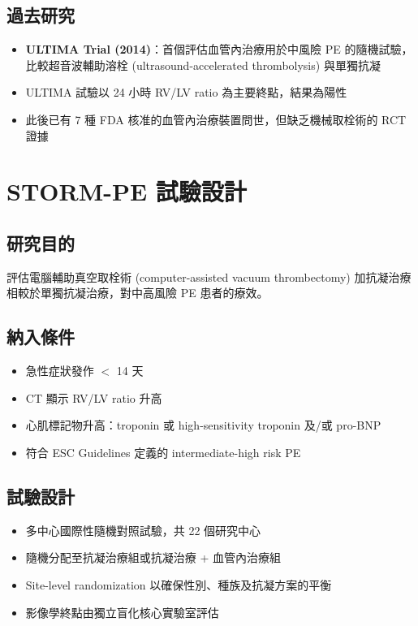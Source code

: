 \documentclass[12pt,a4paper]{article}
\begin{document}
\subsection{過去研究}

\begin{itemize}
    \item \textbf{ULTIMA Trial (2014)}：首個評估血管內治療用於中風險 PE 的隨機試驗，比較超音波輔助溶栓 (ultrasound-accelerated thrombolysis) 與單獨抗凝
    \item ULTIMA 試驗以 24 小時 RV/LV ratio 為主要終點，結果為陽性
    \item 此後已有 7 種 FDA 核准的血管內治療裝置問世，但缺乏機械取栓術的 RCT 證據
\end{itemize}

\section{STORM-PE 試驗設計}

\subsection{研究目的}
評估電腦輔助真空取栓術 (computer-assisted vacuum thrombectomy) 加抗凝治療相較於單獨抗凝治療，對中高風險 PE 患者的療效。

\subsection{納入條件}
\begin{itemize}
    \item 急性症狀發作 $<$ 14 天
    \item CT 顯示 RV/LV ratio 升高
    \item 心肌標記物升高：troponin 或 high-sensitivity troponin 及/或 pro-BNP
    \item 符合 ESC Guidelines 定義的 intermediate-high risk PE
\end{itemize}

\subsection{試驗設計}
\begin{itemize}
    \item 多中心國際性隨機對照試驗，共 22 個研究中心
    \item 隨機分配至抗凝治療組或抗凝治療 + 血管內治療組
    \item Site-level randomization 以確保性別、種族及抗凝方案的平衡
    \item 影像學終點由獨立盲化核心實驗室評估
\end{itemize}
\end{document}
